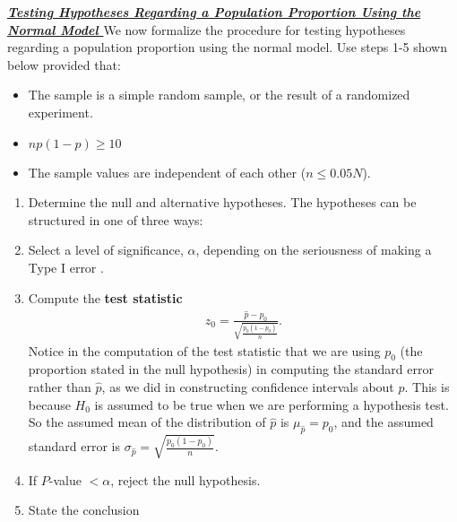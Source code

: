 \documentclass{report}
\begin{document}
    \bigbreak \noindent \bigbreak \noindent 
    \textbf{\textit{\underline{Testing Hypotheses Regarding a Population Proportion Using the Normal Model }}}
    \bigbreak \noindent 
    We now formalize the procedure for testing hypotheses regarding a population proportion using the normal model. 
    \bigbreak \noindent 
    Use steps 1-5 shown below provided that:
    \begin{itemize}
        \item The sample is a simple random sample, or the result of a randomized experiment.
        \item $np(1-p) \geq 10$
        \item The sample values are independent of each other ($n \leq 0.05N$).
    \end{itemize}
    \bigbreak \noindent 
    \begin{enumerate}
        \item Determine the null and alternative hypotheses. The hypotheses can be structured in one of three ways:
        \item Select a level of significance, $\alpha$, depending on the seriousness of making a Type I error .
        \item Compute the \textbf{test statistic}
            \begin{align*}
                z_{0} = \frac{\hat{p}-p_{0}}{\sqrt{\frac{p_{0}(1-p_{0})}{n}}}
            .\end{align*}
         Notice in the computation of the test statistic that we are using $p_0$ (the proportion stated in the null hypothesis) in computing the standard error rather than $\hat{p}$, as we did in constructing confidence intervals about $p$. This is because $H_0$ is assumed to be true when we are performing a hypothesis test. So the assumed mean of the distribution of $\hat{p}$ is $\mu_{\hat{p}}=p_0$, and the assumed standard error is $\sigma_{\hat{p}}= \sqrt{\frac{p_0(1-p_0)}{n}}$.
     \item If $P$-value $< \alpha$, reject the null hypothesis.
    \item State the conclusion
    \end{enumerate}
\end{document}
